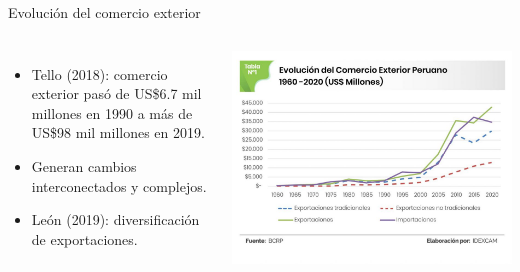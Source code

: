 \documentclass[aspectratio=169]{beamer}
\begin{document}
\begin{frame}{\Large Evolución del comercio exterior}
    \begin{columns}
            \raggedleft %
            \Large
            \begin{itemize}
                \item Tello (2018): comercio exterior pasó de US\$6.7 mil millones en 1990 a más de US\$98 mil millones en 2019.
                \item Generan cambios interconectados y complejos.
                \item León (2019): diversificación de exportaciones.
            \end{itemize}
            \includegraphics[width=\textwidth]{./images/comercio.png} %
    \end{columns}
\end{frame}
\end{document}
